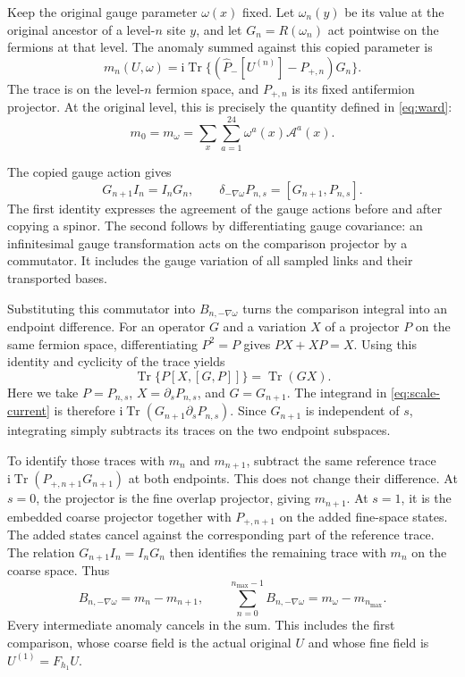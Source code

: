 \documentclass[11pt,a4paper]{article}
\theoremstyle{remark}
\DeclareMathOperator{\Tr}{Tr}
\newcommand{\ii}{\mathrm i}
\begin{document}
Keep the original gauge parameter $\omega(x)$ fixed. Let $\omega_n(y)$
be its value at the original ancestor of a level-$n$ site $y$, and
let $G_n=R(\omega_n)$ act pointwise on the fermions at that level.
The anomaly summed against this copied parameter is
\begin{equation}
 m_n(U,\omega)=\ii\Tr\{
       (\widehat P_-[U^{(n)}]-P_{+,n})G_n\}.
\end{equation}
The trace is on the level-$n$ fermion space, and $P_{+,n}$ is its
fixed antifermion projector. At the original level, this is precisely
the quantity defined in \eqref{eq:ward}:
\begin{equation}
 m_0=m_\omega=\sum_x\sum_{a=1}^{24}
                  \omega^a(x)\mathcal A^a(x).
\end{equation}

The copied gauge action gives
\begin{equation}
 G_{n+1}I_n=I_nG_n,\qquad
 \delta_{-\nabla\omega}P_{n,s}=[G_{n+1},P_{n,s}].
\end{equation}
The first identity expresses the agreement of the gauge actions before
and after copying a spinor. The second follows by differentiating gauge
covariance: an infinitesimal gauge transformation acts on the comparison
projector by a commutator. It includes the gauge variation of all sampled
links and their transported bases.

Substituting this commutator into $B_{n,-\nabla\omega}$ turns the
comparison integral into an endpoint difference. For an operator $G$
and a variation $X$ of a projector $P$ on the same fermion space,
differentiating $P^2=P$ gives $PX+XP=X$.
Using this identity and cyclicity of the trace yields
\begin{equation}
 \Tr\{P[X,[G,P]]\}=\Tr(GX).
\end{equation}
Here we take $P=P_{n,s}$, $X=\partial_sP_{n,s}$, and $G=G_{n+1}$.
The integrand in \eqref{eq:scale-current} is therefore
$\ii\Tr(G_{n+1}\partial_sP_{n,s})$. Since $G_{n+1}$ is independent
of $s$, integrating simply subtracts its traces on the two endpoint
subspaces.

To identify those traces with $m_n$ and $m_{n+1}$, subtract the same
reference trace $\ii\Tr(P_{+,n+1}G_{n+1})$ at both endpoints.
This does not change their difference. At $s=0$, the projector is
the fine overlap projector, giving $m_{n+1}$. At $s=1$, it is the
embedded coarse projector together with $P_{+,n+1}$ on the added
fine-space states. The added states cancel against the corresponding
part of the reference trace. The relation $G_{n+1}I_n=I_nG_n$
then identifies the remaining trace with $m_n$ on the coarse space.
Thus
\begin{equation}
 B_{n,-\nabla\omega}=m_n-m_{n+1},\qquad
 \sum_{n=0}^{n_{\max}-1}B_{n,-\nabla\omega}=m_\omega-m_{n_{\max}} .
 \label{eq:ward-telescope}
\end{equation}
Every intermediate anomaly cancels in the sum. This includes the first
comparison, whose coarse field is the actual original $U$ and whose
fine field is $U^{(1)}=F_{h_1}U$.
\end{document}
